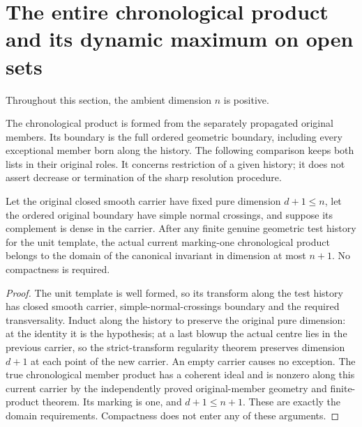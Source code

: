 \section{The entire chronological product and its dynamic maximum on open sets}

Throughout this section, the ambient dimension $n$ is positive.

The chronological product is formed from the separately propagated original
members. Its boundary is the full ordered geometric boundary, including every
exceptional member born along the history. The following comparison keeps both
lists in their original roles. It concerns restriction of a given history; it
does not assert decrease or termination of the sharp resolution procedure.

\begin{theorem}
\label{hir:sharp-original-noncompact-current-product-domain}
\leanok
Let the original closed smooth carrier have fixed pure dimension
$d+1\leq n$, let the ordered original boundary have simple normal crossings,
and suppose its complement is dense in the carrier. After any finite genuine
geometric test history for the unit template, the actual current marking-one
chronological product belongs to the domain of the canonical invariant in
dimension at most $n+1$. No compactness is required.
\end{theorem}
\begin{proof}
The unit template is well formed, so its transform along the test history
has closed smooth carrier, simple-normal-crossings boundary and the required
transversality. Induct along the history to preserve the original pure
dimension: at the identity it is the hypothesis; at a last blowup the actual
centre lies in the previous carrier, so the strict-transform regularity
theorem preserves dimension $d+1$ at each point of the new carrier. An empty
carrier causes no exception. The true chronological member product has a
coherent ideal and is nonzero along this current carrier by the independently
proved original-member geometry and finite-product theorem. Its marking is
one, and $d+1\leq n+1$. These are exactly the domain requirements. Compactness
does not enter any of these arguments.
\end{proof}

